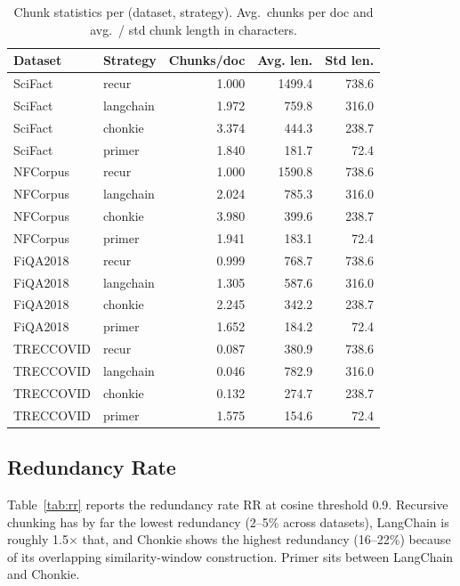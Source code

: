 \documentclass[conference]{IEEEtran}
\begin{document}
\begin{table}[!t]
\caption{Chunk statistics per (dataset, strategy). Avg.\ chunks per doc and avg.\ / std chunk length in characters.}
\label{tab:chunkstats}
\centering
\setlength{\tabcolsep}{4pt}
\begin{tabular}{llrrr}
\toprule
Dataset & Strategy & Chunks/doc & Avg. len. & Std len. \\
\midrule
SciFact & recur     & 1.000 & 1499.4 & 738.6 \\
SciFact & langchain & 1.972 &  759.8 & 316.0 \\
SciFact & chonkie   & 3.374 &  444.3 & 238.7 \\
SciFact & primer    & 1.840 &  181.7 &  72.4 \\
NFCorpus & recur     & 1.000 & 1590.8 & 738.6 \\
NFCorpus & langchain & 2.024 &  785.3 & 316.0 \\
NFCorpus & chonkie   & 3.980 &  399.6 & 238.7 \\
NFCorpus & primer    & 1.941 &  183.1 &  72.4 \\
FiQA2018 & recur     & 0.999 &  768.7 & 738.6 \\
FiQA2018 & langchain & 1.305 &  587.6 & 316.0 \\
FiQA2018 & chonkie   & 2.245 &  342.2 & 238.7 \\
FiQA2018 & primer    & 1.652 &  184.2 &  72.4 \\
TRECCOVID & recur     & 0.087 &  380.9 & 738.6 \\
TRECCOVID & langchain & 0.046 &  782.9 & 316.0 \\
TRECCOVID & chonkie   & 0.132 &  274.7 & 238.7 \\
TRECCOVID & primer    & 1.575 &  154.6 &  72.4 \\
\bottomrule
\end{tabular}
\end{table}

\subsection{Redundancy Rate}

Table~\ref{tab:rr} reports the redundancy rate $\mathrm{RR}$ at cosine
threshold 0.9. Recursive chunking has by far the lowest redundancy
(2--5\% across datasets), LangChain is roughly 1.5$\times$ that, and
Chonkie shows the highest redundancy (16--22\%) because of its overlapping
similarity-window construction. Primer sits between LangChain and Chonkie.
\end{document}

